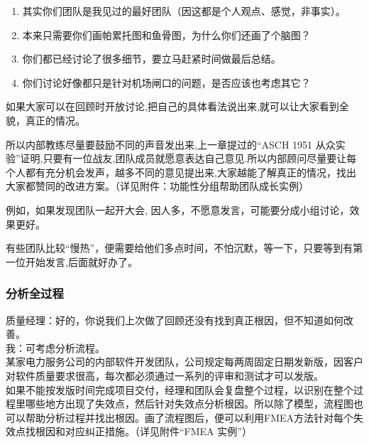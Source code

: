 \begin{enumerate}
\tightlist
\item
  其实你们团队是我见过的最好团队（因这都是个人观点、感觉，非事实）。
\item
  本来只需要你们画帕累托图和鱼骨图，为什么你们还画了个脑图？
\item
  你们都已经讨论了很多细节，要立马赶紧时间做最后总结。
\item
  你们讨论好像都只是针对机场闸口的问题，是否应该也考虑其它？
\end{enumerate}



如果大家可以在回顾时开放讨论,把自己的具体看法说出来,就可以让大家看到全貌，真正的情况。

所以内部教练尽量要鼓励不同的声音发出来,上一章提过的“ASCH 1951 从众实验”证明,只要有一位战友,团队成员就愿意表达自己意见.所以内部顾问尽量要让每个人都有充分机会发声，越多不同的意见提出来,大家越能了解真正的情况，找出大家都赞同的改进方案。（详见附件：功能性分组帮助团队成长实例）

例如，如果发现团队一起开大会,
因人多，不愿意发言，可能要分成小组讨论，效果更好。

有些团队比较“慢热”，便需要给他们多点时间，不怕沉默，等一下，只要等到有第一位开始发言,后面就好办了。

\hypertarget{ux5206ux6790ux5168ux8fc7ux7a0b}{%
\subsubsection{分析全过程}\label{ux5206ux6790ux5168ux8fc7ux7a0b}}

质量经理：好的，你说我们上次做了回顾还没有找到真正根因，但不知道如何改善。\\
我：可考虑分析流程。\\
某家电力服务公司的内部软件开发团队，公司规定每两周固定日期发新版，因客户对软件质量要求很高，每次都必须通过一系列的评审和测试才可以发版。\\
如果不能按发版时间完成项目交付，经理和团队会复盘整个过程，以识别在整个过程里哪些地方出现了失效点，然后针对失效点分析根因。所以除了模型，流程图也可以帮助分析过程并找出根因。画了流程图后，便可以利用FMEA方法针对每个失效点找根因和对应纠正措施。（详见附件``FMEA
实例''）

